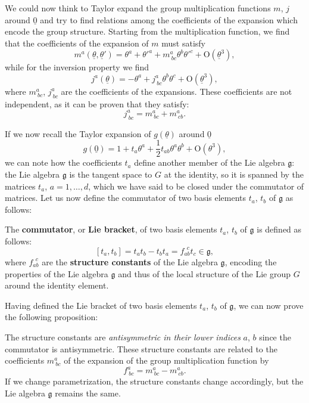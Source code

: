We could now think to Taylor expand the group multiplication functions \(m\), \(j\) around \(\underline{0}\) and try to find relations among the coefficients of the expansion which encode the group structure. Starting from the multiplication function, we find that the coefficients of the expansion of \(m\) must satisfy
\begin{equation}
    m^a(\underline{\theta}, \underline{\theta}') = \theta^a + \theta'^a + m^a_{\ bc} \theta^b \theta'^c + \mathrm{O}(\underline{\theta}^3),
    \label{eq:lie_multiplication_function_taylor_expansion}
\end{equation}
while for the inversion property we find
\begin{equation}
    j^a(\underline{\theta}) = -\theta^a + j^a_{\ bc} \theta^b \theta^c + \mathrm{O}(\underline{\theta}^3),
    \label{eq:lie_inversion_function_taylor_expansion}
\end{equation}
where \(m^a_{\ bc}\), \(j^a_{\ bc}\) are the coefficients of the expansions. These coefficients are not independent, as it can be proven that they satisfy:
\[
    j^a_{\ bc} = m^a_{\ bc} + m^a_{\ cb}.
\]

If we now recall the Taylor expansion of \(g(\underline{\theta})\) around \(\underline{0}\)
\[
    g(\underline{0}) = 1 + t_a \theta^a + \frac{1}{2} t_{ab} \theta^a \theta^b + \mathrm{O}(\theta^3),
\]
we can note how the coefficients \(t_a\) define another member of the Lie algebra \(\mathfrak{g}\): the Lie algebra \(\mathfrak{g}\) is the tangent space to \(G\) at the identity, so it is spanned by the matrices \(t_a\), \(a = 1, \ldots, d\), which we have said to be closed under the commutator of matrices. Let us now define the commutator of two basis elements \(t_a\), \(t_b\) of \(\mathfrak{g}\) as follows:
\begin{definition}
    The \textbf{commutator}, or \textbf{Lie bracket}, of two basis elements \(t_a\), \(t_b\) of \(\mathfrak{g}\) is defined as follows:
    \[
        [t_a, t_b] = t_a t_b - t_b t_a = f_{ab}^{\ \ c} t_c \in \mathfrak{g},
    \]
    where \(f_{ab}^{\ \ c}\) are the \textbf{structure constants} of the Lie algebra \(\mathfrak{g}\), encoding the properties of the Lie algebra \(\mathfrak{g}\) and thus of the local structure of the Lie group \(G\) around the identity element.
\end{definition}

Having defined the Lie bracket of two basis elements \(t_a\), \(t_b\) of \(\mathfrak{g}\), we can now prove the following proposition:
\begin{proposition}
    The structure constants are \textit{antisymmetric in their lower indices} \(a\), \(b\) since the commutator is antisymmetric. These structure constants are related to the coefficients \(m^a_{\ bc}\) of the expansion of the group multiplication function by
    \[
        f^a_{\ bc} = m^a_{\ bc} - m^a_{\ cb}.
    \]
    If we change parametrization, the structure constants change accordingly, but the Lie algebra \(\mathfrak{g}\) remains the same.
\end{proposition}

